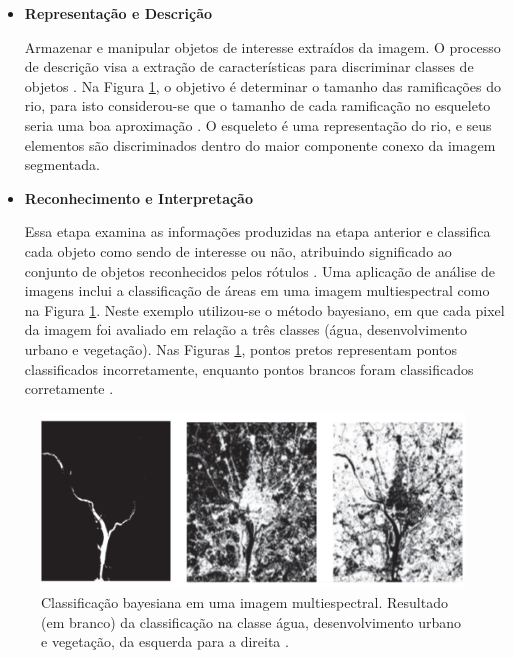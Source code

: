 \documentclass[
  brazilian,
]{book}
\begin{document}
\begin{itemize}
\item
  \textbf{Representação e Descrição}

  Armazenar e manipular objetos de interesse extraídos da imagem. O processo de descrição visa a extração de características para discriminar classes de objetos \autocite[p.~4]{pedrini2008}. Na Figura \ref{fig:analise}, o objetivo é determinar o tamanho das ramificações do rio, para isto considerou-se que o tamanho de cada ramificação no esqueleto seria uma boa aproximação \autocite[p.~545]{gonzalez2010}. O esqueleto é uma representação do rio, e seus elementos são discriminados dentro do maior componente conexo da imagem segmentada.
\item
  \textbf{Reconhecimento e Interpretação}

  Essa etapa examina as informações produzidas na etapa anterior e classifica cada objeto como sendo de interesse ou não, atribuindo significado ao conjunto de objetos reconhecidos pelos rótulos \autocite[p.~3]{pedrini2008}. Uma aplicação de análise de imagens inclui a classificação de áreas em uma imagem multiespectral como na Figura \ref{fig:analise}. Neste exemplo utilizou-se o método bayesiano, em que cada pixel da imagem foi avaliado em relação a três classes (água, desenvolvimento urbano e vegetação). Nas Figuras \ref{fig:analise}, pontos pretos representam pontos classificados incorretamente, enquanto pontos brancos foram classificados corretamente \autocite[p.~579]{gonzalez2010}.
\end{itemize}



\begin{figure}

{\centering \includegraphics[width=0.6\linewidth]{imagens/01-introducao/analise} 

}

\caption{Classificação bayesiana em uma imagem multiespectral. Resultado (em branco) da classificação na classe água, desenvolvimento urbano e vegetação, da esquerda para a direita \autocite[p.~579]{gonzalez2010}.}\label{fig:analise}
\end{figure}
\end{document}
